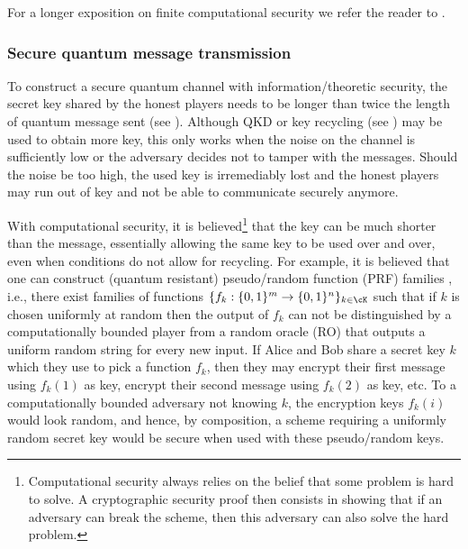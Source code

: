 
For a longer exposition on finite computational security we refer the
reader to \textcite{BMPZ19}.


\subsubsection{Secure quantum message transmission}
\label{sec:computational.qmt}

To construct a secure quantum channel with information\-/theoretic
security, the secret key shared by the honest players needs to be
longer than twice the length of quantum message sent (see
). Although QKD or key recycling (see
) may be used to obtain more key, this only works
when the noise on the channel is sufficiently low or the adversary
decides not to tamper with the messages. Should the noise be too high,
the used key is irremediably lost and the honest players may run out
of key and not be able to communicate securely anymore.

With computational security, it is believed\footnote{Computational
  security always relies on the belief that some problem is hard to
  solve. A cryptographic security proof then consists in showing that
  if an adversary can break the scheme, then this adversary can also
  solve the hard problem.} that the key can be much shorter than the
message, essentially allowing the same key to be used over and over,
even when conditions do not allow for recycling. For example, it is
believed that one can construct (quantum resistant) pseudo\-/random
function (PRF) families \cite{Zha12}, i.e., there exist families of
functions $\{f_k : \{0,1\}^m \to \{0,1\}^n\}_{k \in \cK}$ such that if
$k$ is chosen uniformly at random then the output of $f_k$ can not be
distinguished by a computationally bounded player from a random oracle
(RO) that outputs a uniform random string for every new input. If
Alice and Bob share a secret key $k$ which they use to pick a function
$f_k$, then they may encrypt their first message using $f_k(1)$ as
key, encrypt their second message using $f_k(2)$ as key, etc. To a
computationally bounded adversary not knowing $k$, the encryption keys
$f_k(i)$ would look random, and hence, by composition, a scheme
requiring a uniformly random secret key would be secure when used with
these pseudo\-/random keys.

